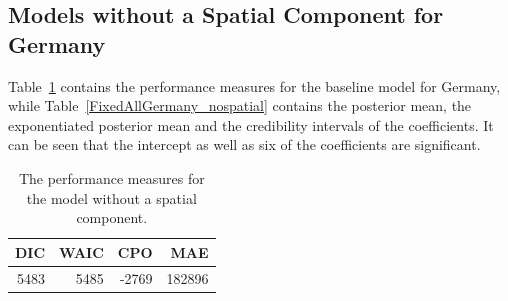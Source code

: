 \subsection{Models without a Spatial Component for Germany}\label{sec:nospatial_germany}
Table~\ref{allGermany_nospatial} contains the performance measures for the baseline model for Germany, while Table~\ref{FixedAllGermany_nospatial} contains the posterior mean, the exponentiated posterior mean and the credibility intervals of the coefficients. It can be seen that the intercept as well as six of the coefficients are significant.
\begin{table}[H] 
\caption{The performance measures for the model without a spatial component. \label{allGermany_nospatial}}
\begin{tabular}{r r r r}
\toprule
\textbf{DIC}	& \textbf{WAIC} & \textbf{CPO} & \textbf{MAE}\\
\midrule
5483 & 5485 & -2769 & 182896 \\
\bottomrule
\end{tabular}
\end{table}
